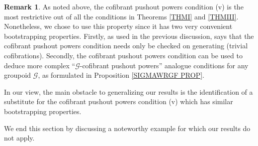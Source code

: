 \documentclass[a4paper,10pt
,draft
]{article}%
\numberwithin{equation}{section}
\numberwithin{figure}{section}
\theoremstyle{definition} %
\newtheorem{remark}[equation]{Remark}%
\newcommand{\G}{\ensuremath{\mathcal G}}
\newcommand{\1}{\ensuremath{\mathbbm 1}}%
\begin{document}
\begin{remark}\label{CPPWHY REM}
	As noted above, the cofibrant pushout powers
	condition (v) is the most restrictive 
	out of all the conditions in 
	Theorems \ref{THMI} and \ref{THMIII}.
	Nonetheless, we chose to use this property 
	since it has two very convenient bootstrapping properties.
	Firstly, as used in the previous discussion, \cite[Rmk. 6.17]{BP_geo}
	says that the cofibrant pushout powers condition needs only be checked on generating (trivial cofibrations).
	Secondly, the cofibrant pushout powers condition 
	can be used to deduce more complex
	``$\G$-cofibrant pushout powers'' analogue conditions for any groupoid $\G$,
	as formulated in Proposition \ref{SIGMAWRGF PROP}.
	
	In our view, the main obstacle to generalizing our results is the identification of 
	a substitute for the cofibrant pushout powers condition (v)
	which has similar bootstrapping properties.
\end{remark}



We end this section by discussing a noteworthy 
example for which our results do not apply.
\end{document}
